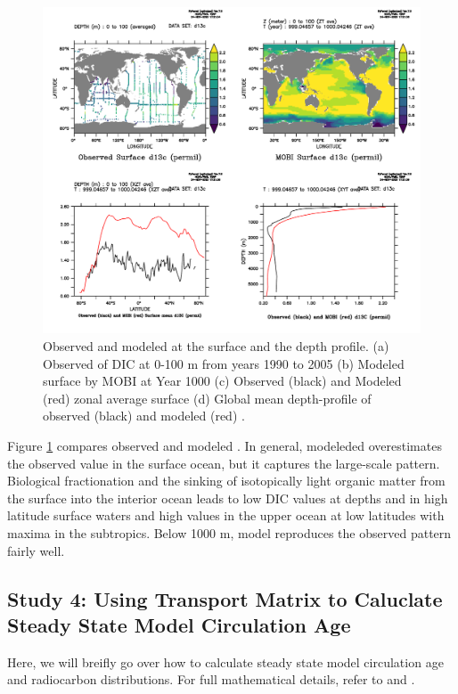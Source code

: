 \documentclass[a4paper]{article}
\begin{document}
\begin{enumerate}
\begin{figure}[h!]   %
   \centering
   \includegraphics[scale=0.5]{MOBI_OBS_C13.pdf}
   \caption[]{Observed and modeled \delta{} at the surface and the depth profile. (a) Observed \delta{} of DIC at 0-100 m from years 1990 to 2005 \citep{Schmittner13}  (b) Modeled surface \delta{} by MOBI at Year 1000 (c) Observed (black) and Modeled (red) zonal average surface \delta{} (d) Global mean depth-profile of observed (black) and modeled (red) \delta{}.}
   \label{fig:c13_mobi}
\end{figure}

Figure \ref{fig:c13_mobi} compares observed and modeled \delta{}. In general, modeleded \delta{} overestimates the observed value in the surface ocean, but it captures the large-scale pattern. Biological fractionation and the sinking of isotopically light \delta{} organic matter from the surface into the interior ocean leads to low \delta{} DIC values at depths and in high latitude surface waters and high values in the upper ocean at low latitudes with maxima in the subtropics. Below 1000 m, model reproduces the observed pattern fairly well.

\end{enumerate}

\subsection{Study 4: Using Transport Matrix to Caluclate Steady State Model Circulation Age}
Here, we will breifly go over how to calculate steady state model circulation age and radiocarbon distributions. For full mathematical details, refer to \citet{Khatiwala05} and  \citet{Khatiwala07}. 
\end{document}
